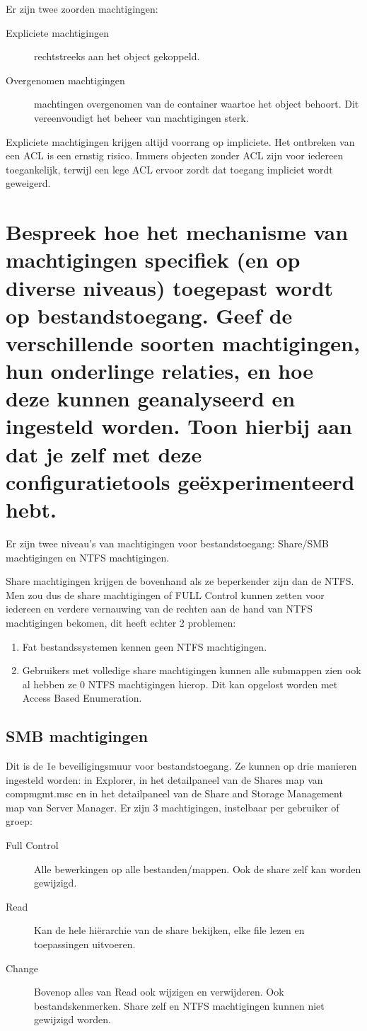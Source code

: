 Er zijn twee zoorden machtigingen:
\begin{description}
	\item[Expliciete machtigingen] rechtstreeks aan het object gekoppeld.
	\item[Overgenomen machtigingen] machtingen overgenomen van de container
		waartoe het object behoort. Dit vereenvoudigt het beheer van
		machtigingen sterk.
\end{description}

Expliciete machtigingen krijgen altijd voorrang op impliciete. Het ontbreken van
een ACL is een ernstig risico. Immers objecten zonder ACL zijn voor iedereen
toegankelijk, terwijl een lege ACL ervoor zordt dat toegang impliciet wordt
geweigerd.

\section{Bespreek hoe het mechanisme van machtigingen specifiek (en op diverse
niveaus) toegepast wordt op bestandstoegang. Geef de verschillende soorten
machtigingen, hun onderlinge relaties, en hoe deze kunnen geanalyseerd en
ingesteld worden. Toon hierbij aan dat je zelf met deze configuratietools
geëxperimenteerd hebt.}

Er zijn twee niveau's van machtigingen voor bestandstoegang: Share/SMB
machtigingen en NTFS machtigingen.

Share machtigingen krijgen de bovenhand als ze beperkender zijn dan de NTFS. Men
zou dus de share machtigingen of FULL Control kunnen zetten voor iedereen en
verdere vernauwing van de rechten aan de hand van NTFS machtigingen bekomen, dit
heeft echter 2 problemen:
\begin{enumerate}
	\item Fat bestandssystemen kennen geen NTFS machtigingen.
	\item Gebruikers met volledige share machtigingen kunnen alle submappen
		zien ook al hebben ze 0 NTFS machtigingen hierop. Dit kan
		opgelost worden met Access Based Enumeration.
\end{enumerate}

\subsection{SMB machtigingen}

Dit is de 1e beveiligingsmuur voor bestandstoegang. Ze kunnen op drie manieren
ingesteld worden: in Explorer, in het detailpaneel van de Shares map van
compmgmt.msc en in het detailpaneel van de Share and Storage Management map van
Server Manager. Er zijn 3 machtigingen, instelbaar per gebruiker of groep:
\begin{description}
	\item[Full Control] Alle bewerkingen op alle bestanden/mappen. Ook de
		share zelf kan worden gewijzigd.
	\item[Read] Kan de hele hiërarchie van de share bekijken, elke file
		lezen en toepassingen uitvoeren.
	\item[Change] Bovenop alles van Read ook wijzigen en verwijderen. Ook
		bestandskenmerken. Share zelf en NTFS machtigingen kunnen niet
		gewijzigd worden.
\end{description}


